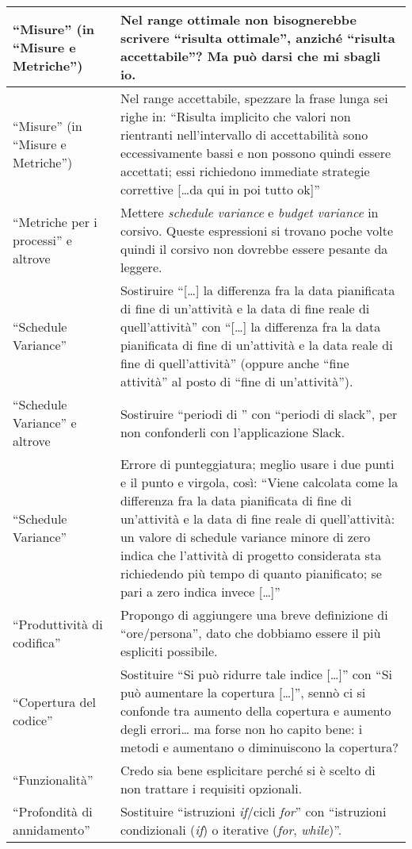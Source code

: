 \documentclass[a4paper]{article}
\begin{document}
\begin{longtable}{| p{3cm} | p{10cm} |}
	“Misure” (in “Misure e Metriche”) & Nel range ottimale non bisognerebbe scrivere “risulta ottimale”, anziché “risulta accettabile”? Ma può darsi che mi sbagli io. \\ \hline
	“Misure” (in “Misure e Metriche”) & Nel range accettabile, spezzare la frase lunga sei righe in: “Risulta implicito che valori non rientranti nell'intervallo di accettabilità sono eccessivamente bassi e non possono quindi essere accettati; essi richiedono immediate strategie correttive [\dots da qui in poi tutto ok]” \\ \hline
	“Metriche per i processi” e altrove & Mettere \emph{schedule variance} e \emph{budget variance} in corsivo. Queste espressioni si trovano poche volte quindi il corsivo non dovrebbe essere pesante da leggere. \\ \hline
	“Schedule Variance” & Sostiruire “[\dots] la differenza fra la data pianificata di fine di un’attività e la data di fine reale di quell'attività” con “[\dots] la differenza fra la data pianificata di fine di un’attività e la data reale di fine di quell'attività” (oppure anche “fine attività” al posto di “fine di un'attività”). \\ \hline
	“Schedule Variance” e altrove & Sostiruire “periodi di \gloss{slack}” con “periodi di slack”, per non confonderli con l'applicazione Slack. \\ \hline
	“Schedule Variance” & Errore di punteggiatura; meglio usare i due punti e il punto e virgola, così: “Viene calcolata come la differenza fra la data pianificata di fine di un'attività e la data di fine reale di quell'attività: un valore di schedule variance minore di zero indica che l'attività di progetto considerata sta richiedendo più tempo di quanto pianificato; se pari a zero indica invece [\dots]” \\ \hline
	“Produttività di codifica” & Propongo di aggiungere una breve definizione di “ore/persona”, dato che dobbiamo essere il più espliciti possibile. \\ \hline
	“Copertura del codice” & Sostituire “Si può ridurre tale indice [\dots]” con “Si può aumentare la copertura [\dots]”, sennò ci si confonde tra aumento della copertura e aumento degli errori\dots{} ma forse non ho capito bene: i metodi \emph{\gloss{getter}} e \emph{\gloss{setter}} aumentano o diminuiscono la copertura? \\ \hline
	“Funzionalità” & Credo sia bene esplicitare perché si è scelto di non trattare i requisiti opzionali. \\ \hline
	“Profondità di annidamento” & Sostituire “istruzioni \emph{if}/cicli \emph{for}” con “istruzioni condizionali (\emph{if}) o iterative (\emph{for}, \emph{while})”. \\ \hline

\end{longtable}
\end{document}
